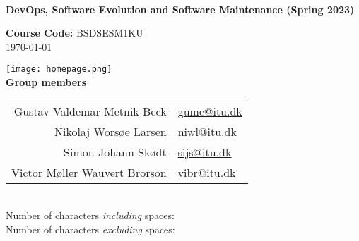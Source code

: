 \begin{titlepage}
    \begin{center}
        \\[0.5cm]
        
        \huge
        \textbf{DevOps, Software Evolution and Software Maintenance (Spring 2023)}\\
        \vspace{0.5cm}

        \Large
        \textbf{Course Code:} BSDSESM1KU\\[0.5cm]
        \large
        \today

        \texttt{[image: homepage.png]}\\

        \textbf{Group members}\\[0.2cm]
        \begin{tabular}{r l}
            Gustav Valdemar Metnik-Beck   & \href{mailto:gume@itu.dk}{gume@itu.dk}\\
            Nikolaj Worsøe Larsen         & \href{mailto:niwl@itu.dk}{niwl@itu.dk}\\
            Simon Johann Skødt            & \href{mailto:sijs@itu.dk}{sijs@itu.dk}\\
            Victor Møller Wauvert Brorson & \href{mailto:vibr@itu.dk}{vibr@itu.dk}      
        \end{tabular}\\[1.3cm]
        
        \normalsize
        Number of characters \textit{including} spaces: \\
        Number of characters \textit{excluding} spaces: 
    \end{center}
\end{titlepage}